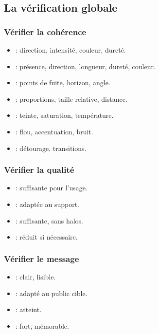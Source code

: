 \subsection{La vérification globale}

\subsubsection{Vérifier la cohérence}

\begin{itemize}
    \item {} : direction, intensité, couleur, dureté.
    \item {} : présence, direction, longueur, dureté, couleur.
    \item {} : points de fuite, horizon, angle.
    \item {} : proportions, taille relative, distance.
    \item {} : teinte, saturation, température.
    \item {} : flou, accentuation, bruit.
    \item {} : détourage, transitions.
\end{itemize}

\subsubsection{Vérifier la qualité}

\begin{itemize}
    \item {} : suffisante pour l'usage.
    \item {} : adaptée au support.
    \item {} : suffisante, sans halos.
    \item {} : réduit si nécessaire.
\end{itemize}

\subsubsection{Vérifier le message}

\begin{itemize}
    \item {} : clair, lisible.
    \item {} : adapté au public cible.
    \item {} : atteint.
    \item {} : fort, mémorable.
\end{itemize}

